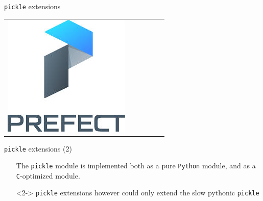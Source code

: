 \documentclass[13pt, usenames,dvipsnames]{beamer} %
\newcommand{\mycode}[2][\tiny] {\texttt{#2}}
\begin{document}
\begin{frame}[fragile]{\mycode[\small]{pickle} extensions}
{\begin{tabular}{m{3cm} m{1cm} m{1cm} m{1cm} m{1cm} m{1cm}}
            \includegraphics[width=\linewidth] {media/prefect-logo.jpeg} &

        \end{tabular}
    }
    \end{frame}

    \begin{frame}[fragile]{\mycode[\small]{pickle} extensions (2)}
        \begin{itemize}
            \footnotesize
              \setlength\itemsep{1em}
            \item[] The \mycode[\tiny]{pickle} module is implemented both as a pure
                \mycode{Python} module, and as a \mycode[\tiny]{C}-optimized module.
            \item[]<2-> \mycode[\tiny]{pickle} extensions however could only extend the slow
        pythonic \mycode[\tiny]{pickle}
        \end{itemize}
    \end{frame}
\end{document}
